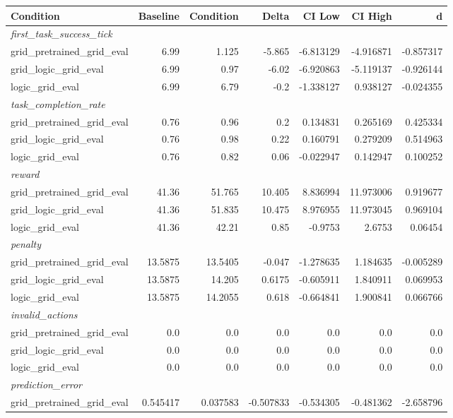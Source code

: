 \begin{tabular}{lrrrrrr}
\toprule
Condition & Baseline & Condition & Delta & CI Low & CI High & d \\
\midrule
  \multicolumn{7}{l}{\textit{first_task_success_tick}} \\
  grid_pretrained_grid_eval & 6.99 & 1.125 & -5.865 & -6.813129 & -4.916871 & -0.857317 \\
  grid_logic_grid_eval & 6.99 & 0.97 & -6.02 & -6.920863 & -5.119137 & -0.926144 \\
  logic_grid_eval & 6.99 & 6.79 & -0.2 & -1.338127 & 0.938127 & -0.024355 \\
  \multicolumn{7}{l}{\textit{task_completion_rate}} \\
  grid_pretrained_grid_eval & 0.76 & 0.96 & 0.2 & 0.134831 & 0.265169 & 0.425334 \\
  grid_logic_grid_eval & 0.76 & 0.98 & 0.22 & 0.160791 & 0.279209 & 0.514963 \\
  logic_grid_eval & 0.76 & 0.82 & 0.06 & -0.022947 & 0.142947 & 0.100252 \\
  \multicolumn{7}{l}{\textit{reward}} \\
  grid_pretrained_grid_eval & 41.36 & 51.765 & 10.405 & 8.836994 & 11.973006 & 0.919677 \\
  grid_logic_grid_eval & 41.36 & 51.835 & 10.475 & 8.976955 & 11.973045 & 0.969104 \\
  logic_grid_eval & 41.36 & 42.21 & 0.85 & -0.9753 & 2.6753 & 0.06454 \\
  \multicolumn{7}{l}{\textit{penalty}} \\
  grid_pretrained_grid_eval & 13.5875 & 13.5405 & -0.047 & -1.278635 & 1.184635 & -0.005289 \\
  grid_logic_grid_eval & 13.5875 & 14.205 & 0.6175 & -0.605911 & 1.840911 & 0.069953 \\
  logic_grid_eval & 13.5875 & 14.2055 & 0.618 & -0.664841 & 1.900841 & 0.066766 \\
  \multicolumn{7}{l}{\textit{invalid_actions}} \\
  grid_pretrained_grid_eval & 0.0 & 0.0 & 0.0 & 0.0 & 0.0 & 0.0 \\
  grid_logic_grid_eval & 0.0 & 0.0 & 0.0 & 0.0 & 0.0 & 0.0 \\
  logic_grid_eval & 0.0 & 0.0 & 0.0 & 0.0 & 0.0 & 0.0 \\
  \multicolumn{7}{l}{\textit{prediction_error}} \\
  grid_pretrained_grid_eval & 0.545417 & 0.037583 & -0.507833 & -0.534305 & -0.481362 & -2.658796 \\

\end{tabular}
